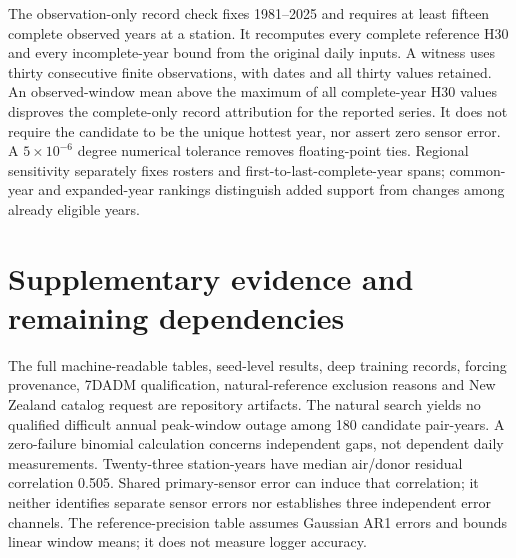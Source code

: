 \documentclass[draft]{agujournal2025}
\begin{document}
The observation-only record check fixes 1981--2025 and requires at least fifteen complete observed years at a station. It recomputes every complete reference H30 and every incomplete-year bound from the original daily inputs. A witness uses thirty consecutive finite observations, with dates and all thirty values retained. An observed-window mean above the maximum of all complete-year H30 values disproves the complete-only record attribution for the reported series. It does not require the candidate to be the unique hottest year, nor assert zero sensor error. A $5\times10^{-6}$ degree numerical tolerance removes floating-point ties. Regional sensitivity separately fixes rosters and first-to-last-complete-year spans; common-year and expanded-year rankings distinguish added support from changes among already eligible years.

\section{Supplementary evidence and remaining dependencies}
The full machine-readable tables, seed-level results, deep training records, forcing provenance, 7DADM qualification, natural-reference exclusion reasons and New Zealand catalog request are repository artifacts. The natural search yields no qualified difficult annual peak-window outage among 180 candidate pair-years. A zero-failure binomial calculation concerns independent gaps, not dependent daily measurements. Twenty-three station-years have median air/donor residual correlation 0.505. Shared primary-sensor error can induce that correlation; it neither identifies separate sensor errors nor establishes three independent error channels. The reference-precision table assumes Gaussian AR1 errors and bounds linear window means; it does not measure logger accuracy.
\end{document}

